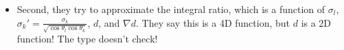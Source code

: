 \documentclass[10pt]{article}
\begin{document}
\begin{itemize}
\begin{itemize}
      \item Second, they try to approximate the integral ratio, which is a function of $\sigma_l$, $\sigma_k' = \frac{\sigma_k}{\sqrt{\cos\theta_l\cos\theta_k}}$, $d$, and $\nabla d$.  They say this is a 4D function, but $d$ is a 2D function!  The type doesn't check!
    \end{itemize}
  \end{itemize}

  
    
\end{document}
